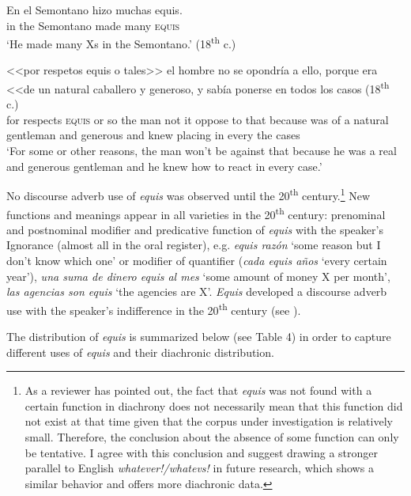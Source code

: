 \documentclass[output=paper]{langsci/langscibook}
\begin{document}
\ea
\gll En el Semontano hizo muchas equis.\\
in the Semontano made many \textsc{equis}\\
\glt ‘He made many Xs in the Semontano.’ (18\textsuperscript{th} c.)
\z

\ea
\gll <<por respetos equis o tales>> el hombre no se	opondría a ello, porque era <<de un natural caballero y generoso, y sabía ponerse en todos los casos (18\textsuperscript{th} c.)\\
for respects \textsc{equis} or so the man not it oppose to that because was of a natural gentleman and generous and knew placing in every the cases\\
\glt ‘For some or other reasons, the man won’t be against that because he was a real and generous gentleman and he knew how to react in every case.’
\z

No discourse adverb use of \textit{equis} was observed until the 20\textsuperscript{th} century.\footnote{As a reviewer has pointed out, the fact that \textit{equis} was not found with a certain function in diachrony does not necessarily mean that this function did not exist at that time given that the corpus under investigation is relatively small. Therefore, the conclusion about the absence of some function can only be tentative. I agree with this conclusion and suggest drawing a stronger parallel to English \textit{whatever!/whatevs!} in future research, which shows a similar behavior and offers more diachronic data.}
New functions and meanings appear in all varieties in the 20\textsuperscript{th} century: prenominal and postnominal modifier and predicative function of \textit{equis} with the speaker’s Ignorance (almost all in the oral register), e.g. \textit{equis razón} ‘some reason but I don’t know which one’ or modifier of quantifier (\textit{cada equis años} ‘every certain year’), \textit{una suma de dinero equis al mes} ‘some amount of money X per month’, \textit{las agencias son equis} ‘the agencies are X’. \textit{Equis} developed a discourse adverb use with the speaker’s indifference in the 20\textsuperscript{th} century (see ).

The distribution of \textit{equis} is summarized below (see Table 4) in order to capture different uses of \textit{equis} and their diachronic distribution.
\end{document}
